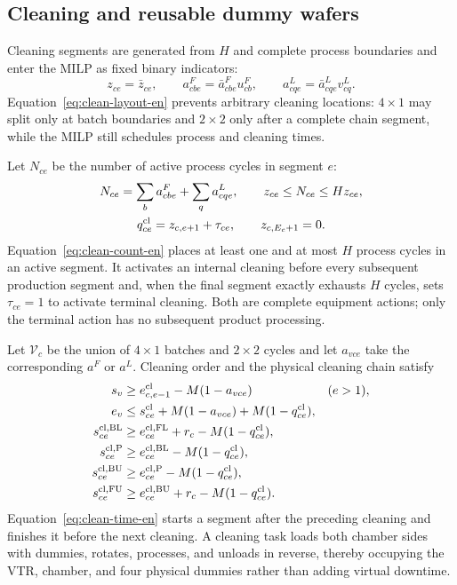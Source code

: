 \documentclass[journal]{IEEEtran}
\begin{document}
\subsection{Cleaning and reusable dummy wafers}

Cleaning segments are generated from $H$ and complete process boundaries and enter the MILP as fixed binary indicators:
\begin{equation}
z_{ce}=\bar z_{ce},\qquad
a^F_{cbe}=\bar a^F_{cbe}u^F_{cb},\qquad
a^L_{cqe}=\bar a^L_{cqe}v^L_{cq}.
\label{eq:clean-layout-en}
\end{equation}
Equation~\eqref{eq:clean-layout-en} prevents arbitrary cleaning locations: $4\times1$ may split only at batch boundaries and $2\times2$ only after a complete chain segment, while the MILP still schedules process and cleaning times.

Let $N_{ce}$ be the number of active process cycles in segment $e$:
\begin{equation}
\begin{gathered}
N_{ce}=\sum_b a^F_{cbe}+\sum_q a^L_{cqe},\qquad
z_{ce}\le N_{ce}\le Hz_{ce},\\
q^{\rm cl}_{ce}=z_{c,e+1}+\tau_{ce},\qquad z_{c,E_c+1}=0.
\end{gathered}
\label{eq:clean-count-en}
\end{equation}
Equation~\eqref{eq:clean-count-en} places at least one and at most $H$ process cycles in an active segment. It activates an internal cleaning before every subsequent production segment and, when the final segment exactly exhausts $H$ cycles, sets $\tau_{ce}=1$ to activate terminal cleaning. Both are complete equipment actions; only the terminal action has no subsequent product processing.

Let $\mathcal V_c$ be the union of $4\times1$ batches and $2\times2$ cycles and let $a_{vce}$ take the corresponding $a^F$ or $a^L$. Cleaning order and the physical cleaning chain satisfy
\begin{equation}
\begin{aligned}
s_v&\ge e^{\rm cl}_{c,e-1}-M(1-a_{vce}) &&(e>1),\\
e_v&\le s^{\rm cl}_{ce}+M(1-a_{vce})+M(1-q^{\rm cl}_{ce}),\\
s^{\rm cl,BL}_{ce}&\ge e^{\rm cl,FL}_{ce}+r_c-M(1-q^{\rm cl}_{ce}),\\
s^{\rm cl,P}_{ce}&\ge e^{\rm cl,BL}_{ce}-M(1-q^{\rm cl}_{ce}),\\
s^{\rm cl,BU}_{ce}&\ge e^{\rm cl,P}_{ce}-M(1-q^{\rm cl}_{ce}),\\
s^{\rm cl,FU}_{ce}&\ge e^{\rm cl,BU}_{ce}+r_c-M(1-q^{\rm cl}_{ce}).
\end{aligned}
\label{eq:clean-time-en}
\end{equation}
Equation~\eqref{eq:clean-time-en} starts a segment after the preceding cleaning and finishes it before the next cleaning. A cleaning task loads both chamber sides with dummies, rotates, processes, and unloads in reverse, thereby occupying the VTR, chamber, and four physical dummies rather than adding virtual downtime.
\end{document}
